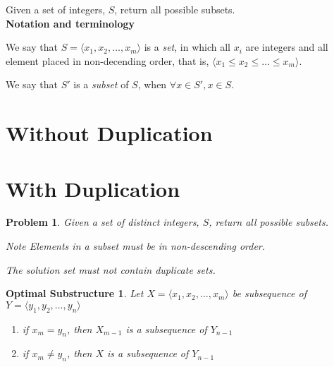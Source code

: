 \documentclass[a4paper, titlepage]{article}
\begin{document}
Given a set of integers, $S$, return all possible subsets. \\

\textbf{Notation and terminology}

We say that $S = \langle x_1, x_2, \dots, x_m \rangle$ is a \emph{set}, in which all $x_i$ are integers and all element placed in non-decending order, that is, $\langle x_1 \leq x_2 \leq \dots \leq x_m \rangle$.


We say that $S'$ is a \emph{subset} of $S$, when $\forall x \in S', x \in S$.

\section{Without Duplication}

\section{With Duplication}

\newtheorem*{problem}{Problem}
\begin{problem}
Given a set of distinct integers, $S$, return all possible subsets. 

\emph{Note}
Elements in a subset must be in non-descending order.

The solution set must not contain duplicate sets.
\end{problem}


\newtheorem*{opt}{Optimal Substructure}
\begin{opt}
Let $X = \langle x_1, x_2, \dots, x_m \rangle$ be subsequence of $Y = \langle y_1, y_2, \dots, y_n \rangle$
	\begin{enumerate}
		\item if $x_m = y_n$, then $X_{m-1}$ is a subsequence of $Y_{n-1}$
		\item if $x_m \neq y_n$, then $X$ is a subsequence of $Y_{n-1}$ 
	\end{enumerate}
\end{opt}
\end{document}
